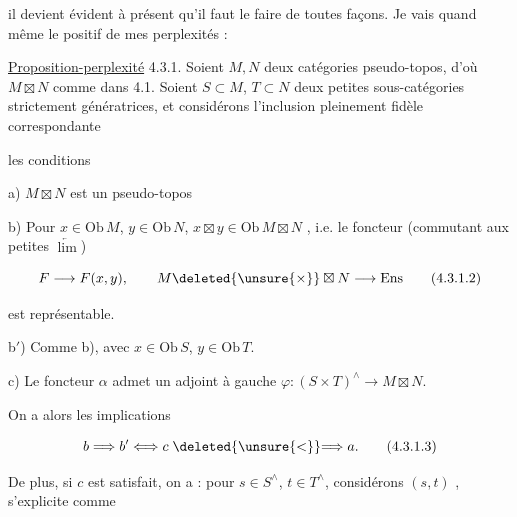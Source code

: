 
 il devient évident à présent qu'il faut le faire de toutes façons. Je vais quand même  le positif de mes perplexités :

\uline{Proposition-perplexité} 4.3.1. Soient $M,N$ deux catégories pseudo-topos, d'où $M\boxtimes N$ comme dans 4.1. Soient $S\subset M$, $T\subset N$ deux petites sous-catégories strictement génératrices, et considérons l'inclusion pleinement fidèle correspondante


 les conditions  

a) $M\boxtimes N$ est un pseudo-topos

b) Pour $x\in\mathrm{Ob}\,M$, $y\in\mathrm{Ob}\,N$, $x\boxtimes y\in\mathrm{Ob}\,M\boxtimes N$ , i.e. le foncteur (commutant aux petites $\underleftarrow{\lim}$)

\[
F\longrightarrow F(x,y),\qquad M\deleted{\unsure{\times}}\boxtimes N\longrightarrow\mathrm{Ens}
\tag*{(4.3.1.2)}
\]

est représentable.

b$'$) Comme b), avec $x\in\mathrm{Ob}\,S$, $y\in\mathrm{Ob}\,T$.

c) Le foncteur $\alpha$   admet un adjoint à gauche $\varphi:(S\times T)^\wedge\longrightarrow M\boxtimes N$.

On a alors les implications


\[
b\Longrightarrow b'\Longleftrightarrow c\mathrel{\deleted{\unsure{<}}}\Longrightarrow a.
\tag*{(4.3.1.3)}
\]

De plus, si $c$ est satisfait, on a  : pour $s\in S^\wedge$, $t\in T^\wedge$,  considérons $(s,t)$ ,  s'explicite  comme

